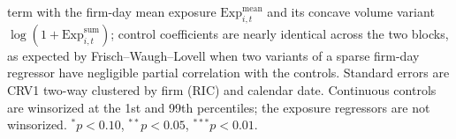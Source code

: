 \begin{table}[htbp]
\begin{threeparttable}
\begin{tablenotes}
term with the firm-day mean exposure $\mathrm{Exp}^{\text{mean}}_{i,t}$ and its
concave volume variant $\log(1+\mathrm{Exp}^{\text{sum}}_{i,t})$; control
coefficients are nearly identical across the two blocks, as expected by
Frisch--Waugh--Lovell when two variants of a sparse firm-day regressor have
negligible partial correlation with the controls. Standard errors are CRV1
two-way clustered by firm (RIC) and calendar date. Continuous controls are
winsorized at the 1st and 99th percentiles; the exposure regressors are not
winsorized. $^{*}p<0.10$, $^{**}p<0.05$, $^{***}p<0.01$.
\end{tablenotes}
\end{threeparttable}
\end{table}
